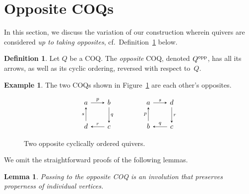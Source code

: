 \documentclass[11pt, letterpaper]{amsart}
\newtheorem{lemma}[theorem]{Lemma}
\theoremstyle{definition}
\newtheorem{example}[theorem]{Example}
\newtheorem{definition}[theorem]{Definition}
\numberwithin{equation}{section}
\begin{document}
\section{Opposite COQs}
\label{sec:opposite}

In this section, we discuss the variation of our construction wherein quivers are considered
\emph{up to taking opposites}, cf.\ Definition~\ref{def:opposite-quiver} below.

\begin{definition}
\label{def:opposite-quiver}
Let $Q$ be a COQ. 
The \emph{opposite} COQ, denoted $Q^{\textup{opp}}$, has all its arrows, as well as its cyclic ordering, 
reversed with respect to~$Q$.
\end{definition}

\begin{example}
The two COQs shown in Figure~\ref{fig:opposite-coq} are each other's opposites.

\end{example}

\begin{figure}[ht]
\begin{center}
\vspace{-10pt}
\begin{equation*}
\begin{tikzcd}[arrows={-stealth}, sep=2em]
  a  \arrow[r, "p"] & b \arrow[d, "q"]  \\
 d\arrow[u, "s"]  & c   \arrow[l, swap, "r"] 
\end{tikzcd}
\qquad\qquad
\begin{tikzcd}[arrows={-stealth}, sep=2em]
  a  \arrow[r, "s"] & d \arrow[d, "r"]  \\
 b\arrow[u, "p"]  & c   \arrow[l, swap, "q"] 
\end{tikzcd}
\end{equation*}
\end{center}
\caption{Two opposite cyclically ordered quivers.}
\vspace{-10pt}
\label{fig:opposite-coq}
\end{figure}


We omit the straightforward proofs of the following lemmas. 

\begin{lemma}
\label{lem:opposite-proper}
Passing to the opposite COQ is an involution that preserves properness of individual vertices. 
\end{lemma}
\end{document}

